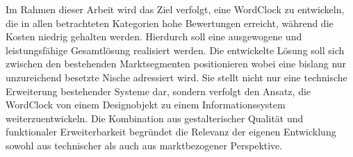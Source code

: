 Im Rahmen dieser Arbeit wird das Ziel verfolgt, eine WordClock zu entwickeln, die in allen betrachteten Kategorien hohe Bewertungen erreicht, während die Kosten niedrig gehalten werden. 
Hierdurch soll eine ausgewogene und leistungsfähige Gesamtlösung realisiert werden.
Die entwickelte Lösung soll sich zwischen den bestehenden Marktsegmenten positionieren wobei eine bislang nur unzureichend besetzte Nische adressiert wird. 
Sie stellt nicht nur eine technische Erweiterung bestehender Systeme dar, sondern verfolgt den Ansatz, die WordClock von einem Designobjekt zu einem Informationssystem weiterzuentwickeln. 
Die Kombination aus gestalterischer Qualität und funktionaler Erweiterbarkeit begründet die Relevanz der eigenen Entwicklung sowohl aus technischer als auch aus marktbezogener Perspektive.